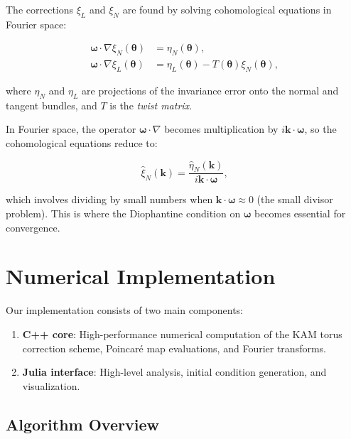 \documentclass[review,onefignum,onetabnum]{siamart220329}
\begin{document}
The corrections $\xi_L$ and $\xi_N$ are found by solving cohomological equations
in Fourier space:

\begin{equation}
\label{eq:cohomological}
\begin{aligned}
    \boldsymbol{\omega} \cdot \nabla \xi_N(\boldsymbol{\theta}) &= \eta_N(\boldsymbol{\theta}), \\
    \boldsymbol{\omega} \cdot \nabla \xi_L(\boldsymbol{\theta}) &= \eta_L(\boldsymbol{\theta})
    - T(\boldsymbol{\theta}) \xi_N(\boldsymbol{\theta}),
\end{aligned}
\end{equation}

where $\eta_N$ and $\eta_L$ are projections of the invariance error onto the
normal and tangent bundles, and $T$ is the \emph{twist matrix}.

In Fourier space, the operator $\boldsymbol{\omega} \cdot \nabla$ becomes
multiplication by $i \mathbf{k} \cdot \boldsymbol{\omega}$, so the cohomological
equations reduce to:

\begin{equation}
\hat{\xi}_N(\mathbf{k}) = \frac{\hat{\eta}_N(\mathbf{k})}{i \mathbf{k} \cdot \boldsymbol{\omega}},
\end{equation}

which involves dividing by small numbers when $\mathbf{k} \cdot \boldsymbol{\omega}
\approx 0$ (the small divisor problem). This is where the Diophantine condition
on $\boldsymbol{\omega}$ becomes essential for convergence.

\section{Numerical Implementation}
\label{sec:method}

Our implementation consists of two main components:
\begin{enumerate}
    \item \textbf{C++ core}: High-performance numerical computation of the KAM
          torus correction scheme, Poincaré map evaluations, and Fourier transforms.
    \item \textbf{Julia interface}: High-level analysis, initial condition generation,
          and visualization.
\end{enumerate}

\subsection{Algorithm Overview}
\end{document}
